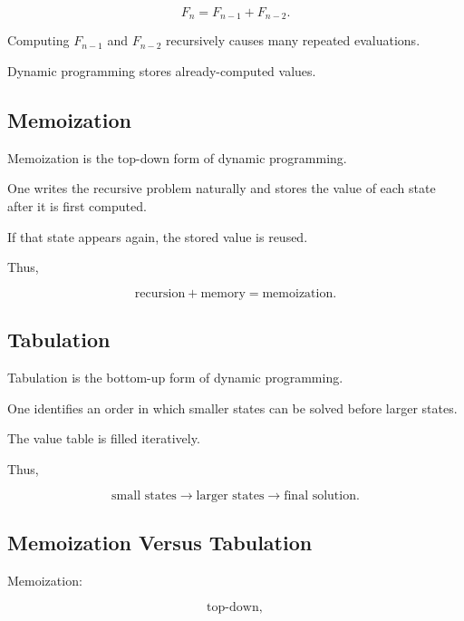 \[
F_n
=
F_{n-1}
+
F_{n-2}.
\]

Computing \(F_{n-1}\) and \(F_{n-2}\) recursively causes many repeated
evaluations.

Dynamic programming stores already-computed values.

\subsection{Memoization}
\label{subsec:dynamic-programming-memoization}

Memoization is the top-down form of dynamic programming.

One writes the recursive problem naturally and stores the value of each
state after it is first computed.

If that state appears again, the stored value is reused.

Thus,

\[
\boxed{
\text{recursion}
+
\text{memory}
=
\text{memoization}.
}
\]

\subsection{Tabulation}
\label{subsec:dynamic-programming-tabulation}

Tabulation is the bottom-up form of dynamic programming.

One identifies an order in which smaller states can be solved before larger
states.

The value table is filled iteratively.

Thus,

\[
\boxed{
\text{small states}
\rightarrow
\text{larger states}
\rightarrow
\text{final solution}.
}
\]

\subsection{Memoization Versus Tabulation}
\label{subsec:memoization-versus-tabulation}

Memoization:

\[
\boxed{
\text{top-down},
}
\]

